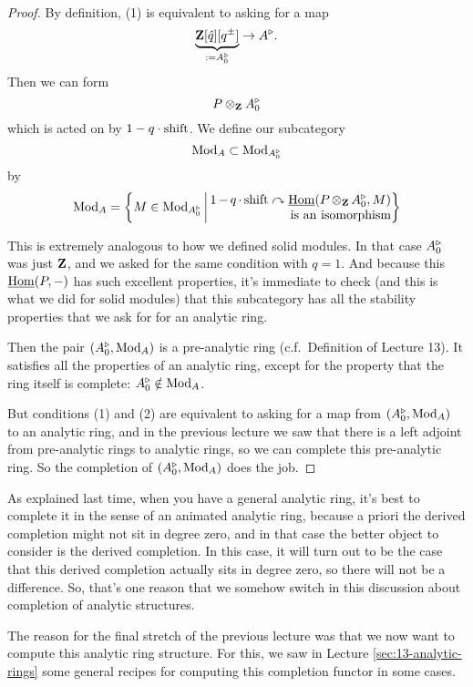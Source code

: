\begin{proof}
By definition, (1) is equivalent to asking for a map
\[
  \underbrace{\mathbf Z[\hat q][q^\pm]}_{\mathrel{:=} A_0^\triangleright} \to A^\triangleright.
\]
Then we can form
\[ P\otimes_\mathbf Z A_0^\triangleright \]
which is acted on by $1-q\cdot\mathrm{shift}$. We define our subcategory
\[ \operatorname{Mod}_A \subset \operatorname{Mod}_{A_0^\triangleright} \]
by
\[
  \Mod_A = \left\{
    M \in \Mod_{A_0^\tri}
    \,\middle|\,
    \parbox[c]{5cm}{\raggedleft$1-q\cdot\shift\actson\ul\Hom(P\tnsr_\Z A_0^\tri,M)$\\is an isomorphism}
  \right\}
\]

This is extremely analogous to how we defined solid modules. In that case $A^\triangleright_0$ was just $\mathbf Z$, and we asked for the same condition with $q=1$. And because this $\underline{\operatorname{Hom}}(P,-)$ has such excellent properties, it's immediate to check (and this is what we did for solid modules) that this subcategory has all the stability properties that we ask for for an analytic ring.

Then the pair $(A_0^\triangleright,\operatorname{Mod}_A)$ is a pre-analytic ring (c.f.\ Definition \citeme{} of Lecture 13). It satisfies all the properties of an analytic ring, except for the property that the ring itself is complete: $A^\triangleright_0\notin\operatorname{Mod}_A$.

But conditions (1) and (2) are equivalent to asking for a map from $(A_0^\triangleright,\operatorname{Mod}_A)$ to an analytic ring, and in the previous lecture we saw that there is a left adjoint from pre-analytic rings to analytic rings, so we can complete this pre-analytic ring. So the completion of $(A_0^\triangleright,\operatorname{Mod}_A)$ does the job.
\end{proof}

As explained last time, when you have a general analytic ring, it's best to complete it in the sense of an animated analytic ring, because a priori the derived completion might not sit in degree zero, and in that case the better object to consider is the derived completion. In this case, it will turn out to be the case that this derived completion actually sits in degree zero, so there will not be a difference. So, that's one reason that we somehow switch in this discussion about completion of analytic structures.

The reason for the final stretch of the previous lecture was that we now want to compute this analytic ring structure. For this, we saw in Lecture \ref{sec:13-analytic-rings} some general recipes for computing this completion functor in some cases.

